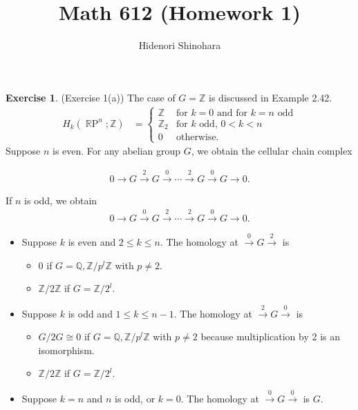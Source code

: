 \documentclass[12pt, psamsfonts]{amsart}
\theoremstyle{definition}
\newtheorem*{exer}{Exercise}
\theoremstyle{remark}
\DeclareMathOperator{\RP}{\mathbb{R}P}
\numberwithin{equation}{section}
\begin{document}
\title{Math 612 (Homework 1)}
\author{Hidenori Shinohara}
\maketitle

\begin{exer}{(Exercise 1(a))}
  The case of $G = \mathbb{Z}$ is discussed in Example 2.42.
  \begin{align*}
    H_k(\RP^n; \mathbb{Z}) &= \begin{cases}
      \mathbb{Z} & \text{for $k = 0$ and for $k = n$ odd} \\
      \mathbb{Z}_2 & \text{for $k$ odd, $0 < k < n$} \\
      0 & \text{otherwise}.
    \end{cases}
  \end{align*}
  Suppose $n$ is even.
  For any abelian group $G$, we obtain the cellular chain complex

  \begin{align*}
    0 \rightarrow G \xrightarrow{2} G \xrightarrow{0} \cdots \xrightarrow{2} G \xrightarrow{0} G \rightarrow 0.
  \end{align*}

  If $n$ is odd, we obtain
  \begin{align*}
    0 \rightarrow G \xrightarrow{0} G \xrightarrow{2} \cdots \xrightarrow{2} G \xrightarrow{0} G \rightarrow 0.
  \end{align*}

  \begin{itemize}
    \item
      Suppose $k$ is even and $2 \leq k \leq n$.
      The homology at $\xrightarrow{0} G \xrightarrow{2}$ is
      \begin{itemize}
        \item
          $0$ if $G = \mathbb{Q}, \mathbb{Z}/p^l\mathbb{Z}$ with $p \ne 2$.
        \item
          $\mathbb{Z} / 2\mathbb{Z}$ if $G = \mathbb{Z}/2^l$.
      \end{itemize}
    \item
      Suppose $k$ is odd and $1 \leq k \leq n - 1$.
      The homology at $\xrightarrow{2} G \xrightarrow{0}$ is
      \begin{itemize}
        \item
          $G / 2G \cong 0$ if $G = \mathbb{Q}, \mathbb{Z}/p^l\mathbb{Z}$ with $p \ne 2$ because multiplication by 2 is an isomorphism.
        \item
          $\mathbb{Z} / 2\mathbb{Z}$ if $G = \mathbb{Z}/2^l$.
      \end{itemize}
    \item
      Suppose $k = n$ and $n$ is odd, or $k = 0$.
      The homology at $\xrightarrow{0} G \xrightarrow{0}$ is $G$.
  \end{itemize}


\end{exer}
\end{document}
